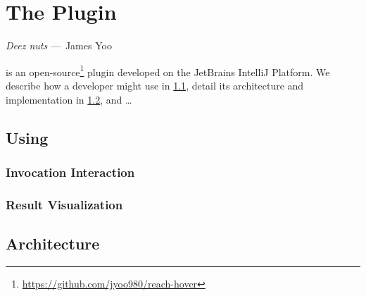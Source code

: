 
\chapter{The \toolname{} Plugin}
\label{ch:Tool}

\begin{epigraph}
  \emph{
    Deez nuts
    } ---~James Yoo
\end{epigraph}

\noindent \toolname{} is an open-source\footnote{\url{https://github.com/jyoo980/reach-hover}}
plugin developed on the JetBrains IntelliJ Platform.
We describe how a developer might use \toolname{} in
\ref{sec:UsingReachHover}, detail its architecture and implementation in
\ref{sec:Architecture}, and \dots

\section{Using \toolname{}}
\label{sec:UsingReachHover}

\subsection{Invocation Interaction}
\label{subsection:InvocationInteraction}


\subsection{Result Visualization}
\label{subsection:ResultVisualization}


\section{\toolname{} Architecture}
\label{sec:Architecture}

\endinput
